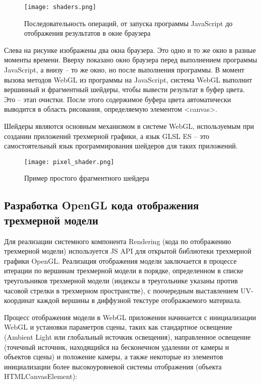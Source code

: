 \begin{figure}[ht]
\centering
  \texttt{[image: shaders.png]}
  \caption{Последовательность операций, от запуска программы JavaScript до отображения результатов в окне браузера}
  \label{figure:dev:shaders}
\end{figure}

Слева на рисунке  изображены два окна браузера. Это одно и то же окно в разные моменты времени. Вверху показано окно браузера перед выполнением программы JavaScript,
а внизу – то же окно, но после выполнения программы. В момент вызова методов WebGL из программы на JavaScript, система WebGL выполнит вершинный и фрагментный шейдеры, 
чтобы вывести результат в буфер цвета. Это – этап очистки. После этого содержимое буфера цвета автоматически выводится в область рисования, определяемую элементом <canvas>.

Шейдеры являются основным механизмом в системе WebGL, используемым при создании приложений трехмерной графики, а язык GLSL ES –
это самостоятельный язык программирования шейдеров для таких приложений. 

\begin{figure}[ht]
\centering
  \texttt{[image: pixel\_shader.png]}
  \caption{Пример простого фрагментного шейдера}
  \label{figure:dev:pixel_shader}
\end{figure}

\subsection{Разработка OpenGL кода отображения трехмерной модели}
\label{sub:dev:shaders:opengl}

Для реализации системного компонента Rendering (кода по отображению трехмерной модели) используется JS API для открытой библиотеки трехмерной графики OpenGL. Реализация отображения
модели заключается в процессе итерации по вершинам трехмерной модели в порядке, определенном в списке треугольников трехмерной модели (индексы в треугольнике указаны против часовой стрелки
в трехмерном пространстве), с поочередным выставлением UV-координат каждой вершины в диффузной текстуре отображаемого материала.

Процесс отображения модели в WebGL приложении начинается с инициализации WebGL и установки параметров сцены, таких как стандартное освещение (Ambient Light или глобальный источкик
освещения), направленное освещение (точечный источник, находящийся на бесконечном удалении от камеры и объектов сцены) и положение камеры, а также некоторые из элементов инициализации
более высокоуровневой системы отображения (объекта HTMLCanvasElement):

